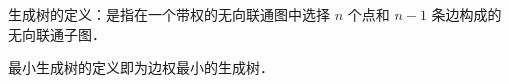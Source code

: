 
\begin{issues}
\issueMissDepend
\end{issues}

生成树的定义：是指在一个带权的无向联通图中选择 $n$ 个点和 $n - 1$ 条边构成的无向联通子图．

最小生成树的定义即为边权最小的生成树．



